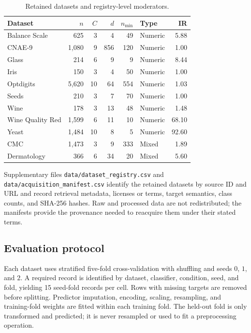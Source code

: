 \documentclass[10pt]{article}
\begin{document}
\begin{table}[t]
\centering
\caption{Retained datasets and registry-level moderators.}
\label{tab:datasets}
\small
\begin{tabular}{@{}lrrrrlr@{}}
\toprule
Dataset & $n$ & $C$ & $d$ & $n_{\min}$ & Type & IR \\
\midrule
Balance Scale & 625 & 3 & 4 & 49 & Numeric & 5.88 \\
CNAE-9 & 1,080 & 9 & 856 & 120 & Numeric & 1.00 \\
Glass & 214 & 6 & 9 & 9 & Numeric & 8.44 \\
Iris & 150 & 3 & 4 & 50 & Numeric & 1.00 \\
Optdigits & 5,620 & 10 & 64 & 554 & Numeric & 1.03 \\
Seeds & 210 & 3 & 7 & 70 & Numeric & 1.00 \\
Wine & 178 & 3 & 13 & 48 & Numeric & 1.48 \\
Wine Quality Red & 1,599 & 6 & 11 & 10 & Numeric & 68.10 \\
Yeast & 1,484 & 10 & 8 & 5 & Numeric & 92.60 \\
CMC & 1,473 & 3 & 9 & 333 & Mixed & 1.89 \\
Dermatology & 366 & 6 & 34 & 20 & Mixed & 5.60 \\
\bottomrule
\end{tabular}
\end{table}

Supplementary files \texttt{data/dataset\_registry.csv} and \texttt{data/acquisition\_manifest.csv} identify the retained datasets by source ID and URL and record retrieval metadata, licenses or terms, target semantics, class counts, and SHA-256 hashes. Raw and processed data are not redistributed; the manifests provide the provenance needed to reacquire them under their stated terms.

\subsection{Evaluation protocol}

Each dataset uses stratified five-fold cross-validation with shuffling and seeds $0$, $1$, and $2$. A required record is identified by dataset, classifier, condition, seed, and fold, yielding 15 seed-fold records per cell. Rows with missing targets are removed before splitting. Predictor imputation, encoding, scaling, resampling, and training-fold weights are fitted within each training fold. The held-out fold is only transformed and predicted; it is never resampled or used to fit a preprocessing operation.
\end{document}
